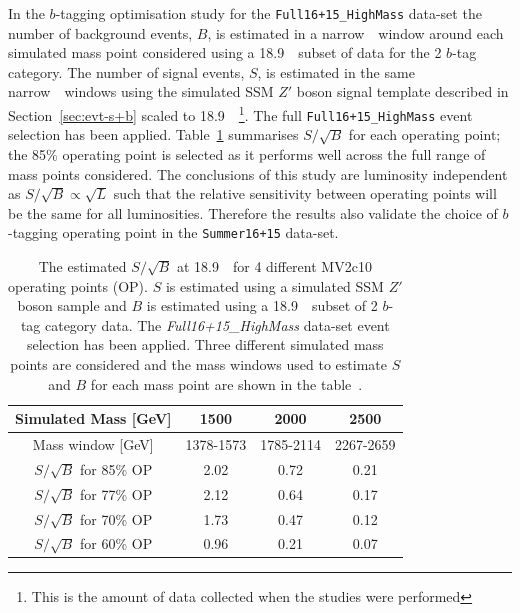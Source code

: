 In the $b$-tagging optimisation study for the \verb|Full16+15_HighMass| data-set
the number of background events, $B$, is estimated in
a narrow~\mjj~window around
each simulated mass point considered using a
18.9~\ifb~subset of data for the 2 $b$-tag category.
The number of signal events, $S$, is estimated
in the same narrow~\mjj~windows using 
the simulated SSM $Z'$ boson signal template
described in Section~\ref{sec:evt-s+b} scaled to 18.9~\ifb~\footnote{This is
  the amount of data collected when the studies were performed}.
The full \verb|Full16+15_HighMass| event selection has been applied.
Table~\ref{tab:evt-btag_hm} summarises $S/\sqrt{B}$ for each operating point;
the 85\% operating point is selected as it performs well across the full range of mass points considered.
The conclusions of this study are luminosity independent
as $S/\sqrt{B} \propto \sqrt{L}$ such that the relative sensitivity
between operating points will be the same for all luminosities.
Therefore the results also validate the choice of $b$-tagging operating point in the \verb|Summer16+15| data-set.

\vspace{-0.4em}
\begin{table}[ht]
\begin{center}
\begin{tabular}{|c||c|c|c|}
  \hline
  Simulated Mass [GeV]        &  1500  &   2000  &  2500  \\
  \hline
  Mass window [GeV]               & 1378-1573       &  1785-2114   &  2267-2659 \\
  \hline
  $S/\sqrt{B}$ for 85\% OP        &  2.02           &  0.72        &  0.21          \\
  $S/\sqrt{B}$ for 77\% OP        &  2.12           &  0.64        &  0.17          \\
  $S/\sqrt{B}$ for 70\% OP        &  1.73           &  0.47        &  0.12          \\
  $S/\sqrt{B}$ for 60\% OP        &  0.96           &  0.21        &  0.07          \\ \hline
\end{tabular}
\caption[The estimated $S/\sqrt{B}$ at 18.9~\ifb~for 4 different MV2c10 operating points (OP).
  $S$ is estimated using a simulated SSM $Z'$ boson sample and $B$ is estimated using a 18.9~\ifb~subset of 2 $b$-tag category data.
  The \textit{Full16+15\_HighMass} data-set event selection has been applied.
  Three different simulated mass points are considered and the mass windows used
  to estimate $S$ and $B$ for each mass point are shown in the table.]
        {The estimated $S/\sqrt{B}$ at 18.9~\ifb~for 4 different MV2c10 operating points (OP).
          $S$ is estimated using a simulated SSM $Z'$ boson sample and $B$ is estimated using a 18.9~\ifb~subset of 2 $b$-tag category data.
          The \textit{Full16+15\_HighMass} data-set event selection has been applied.
          Three different simulated mass points are considered and the mass windows used
          to estimate $S$ and $B$ for each mass point are shown in the table~\cite{dibjet-full_int}.}
        \label{tab:evt-btag_hm}        
\end{center}
\vspace{-2em}
\end{table}

